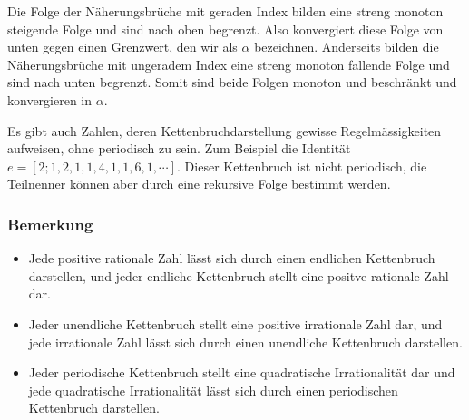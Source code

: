 Die Folge der Näherungsbrüche mit geraden Index bilden eine streng
monoton steigende Folge und sind nach oben begrenzt. Also konvergiert
diese Folge von unten gegen einen Grenzwert, den wir als $\alpha$
bezeichnen. Anderseits bilden die Näherungsbrüche mit ungeradem
Index eine streng monoton fallende Folge und sind nach unten begrenzt.
Somit sind beide Folgen monoton und beschränkt und konvergieren in
$\alpha$.

Es gibt auch Zahlen, deren Kettenbruchdarstellung gewisse
Regelmässigkeiten aufweisen, ohne periodisch zu sein. Zum Beispiel
die Identität $e = [2;1,2,1,1,4,1,1,6,1,\cdots]$. Dieser
Kettenbruch ist nicht periodisch, die Teilnenner können aber durch
eine rekursive Folge bestimmt werden.

\subsubsection{Bemerkung}
\begin{itemize}
\item
Jede positive rationale Zahl lässt sich durch einen endlichen
Kettenbruch darstellen, und jeder endliche Kettenbruch stellt eine
positve rationale Zahl dar.
\item
Jeder unendliche Kettenbruch stellt eine positive irrationale Zahl
dar, und jede irrationale Zahl lässt sich durch einen unendliche
Kettenbruch darstellen.
\item
Jeder periodische Kettenbruch stellt eine quadratische Irrationalität
dar und jede quadratische Irrationalität lässt sich durch einen
periodischen Kettenbruch darstellen.
\end{itemize}